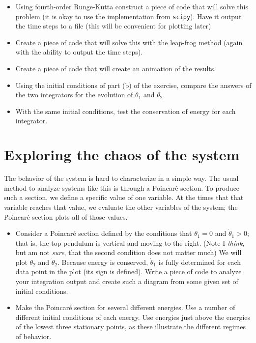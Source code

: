 \documentclass[11pt, preprint]{aastex}
\begin{document}
\begin{itemize}
\item Using fourth-order Runge-Kutta construct a piece of code that
  will solve this problem (it is okay to use the implementation from
  {\tt scipy}). Have it output the time steps to a file (this will be
  convenient for plotting later)
\item Create a piece of code that will solve this with the leap-frog
  method (again with the ability to output the time steps).
\item Create a piece of code that will create an animation of the
  results.
\item Using the initial conditions of part (b) of the exercise,
  compare the answers of the two integrators for the evolution of
  $\theta_1$ and $\theta_2$.
\item With the same initial conditions, test the conservation of
  energy for each integrator.
\end{itemize}

\section{Exploring the chaos of the system}

The behavior of the system is hard to characterize in a simple
way. The usual method to analyze systems like this is through a
Poincar{\'e} section. To produce such a section, we define a specific
value of one variable. At the times that that variable reaches that
value, we evaluate the other variables of the system; the Poincar{\'e}
section plots all of those values.

\begin{itemize}
\item Consider a Poincar{\'e} section defined by the conditions that
  $\theta_1=0$ and $\dot\theta_1>0$; that is, the top pendulum is
  vertical and moving to the right.  (Note I {\it think}, but am not
  {\it sure}, that the second condition does not matter much) We will
  plot $\theta_2$ and $\dot\theta_2$. Because energy is conserved,
  $\dot\theta_1$ is fully determined for each data point in the plot
  (its sign is defined). Write a piece of code to analyze your
  integration output and create such a diagram from some given set of
  initial conditions.
 \item Make the Poincar{\'e} section for several different
   energies. Use a number of different initial conditions of each
   energy. Use energies just above the energies of the lowest three
   stationary points, as these illustrate the different regimes of
   behavior.
\end{itemize}
\end{document}
